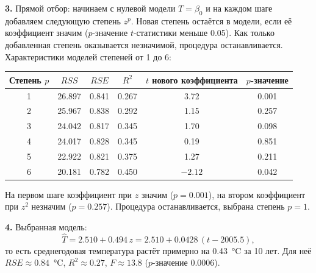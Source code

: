\documentclass{article}
\begin{document}
    \textbf{3.} Прямой отбор: начинаем с нулевой модели $T=\beta_0$ и на каждом шаге добавляем следующую степень $z^p$. Новая степень остаётся в модели, если её коэффициент значим ($p$-значение $t$-статистики меньше 0.05). Как только добавленная степень оказывается незначимой, процедура останавливается. Характеристики моделей степеней от 1 до 6:
    \begin{center}
    \begin{tabular}{|c|c|c|c|c|c|}
        \hline
        Степень $p$ & $RSS$ & $RSE$ & $R^2$ & $t$ нового коэффициента & $p$-значение \\ \hline
        1 & 26.897 & 0.841 & 0.267 & 3.72 & 0.001 \\
        2 & 25.967 & 0.838 & 0.292 & 1.15 & 0.257 \\
        3 & 24.042 & 0.817 & 0.345 & 1.70 & 0.098 \\
        4 & 24.017 & 0.828 & 0.345 & 0.19 & 0.851 \\
        5 & 22.922 & 0.821 & 0.375 & 1.27 & 0.211 \\
        6 & 20.181 & 0.782 & 0.450 & $-2.12$ & 0.042 \\ \hline
    \end{tabular}
    \end{center}
    На первом шаге коэффициент при $z$ значим ($p=0.001$), на втором коэффициент при $z^2$ незначим ($p=0.257$). Процедура останавливается, выбрана степень $p=1$.

    \textbf{4.} Выбранная модель:
    \[\hat T=2.510+0.494\,z=2.510+0.0428\,(t-2005.5),\]
    то есть среднегодовая температура растёт примерно на 0.43~°C за 10 лет. Для неё $RSE\approx0.84$~°C, $R^2\approx0.27$, $F\approx13.8$ ($p$-значение 0.0006).
\end{document}
